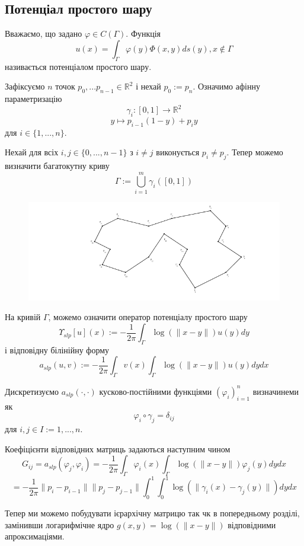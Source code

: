 \documentclass[12pt]{report}
\begin{document}
	\subsection{Потенціал простого шару}
	\begin{Def}
		Вважаємо, що задано $\varphi\in C(\Gamma)$. Функція $$u(x)=\int_{\Gamma}\varphi(y)\Phi(x,y)ds(y),  x\not\in\Gamma$$
		називається потенціалом простого шару.
	\end{Def}
	\par Зафіксуємо $n$ точок $p_0,...p_{n-1}\in \mathbb{R}^2$ і нехай $p_0:=p_n$. Означимо афінну параметризацію $$\gamma_i:[0,1]\rightarrow\mathbb{R}^2$$
	$$y\mapsto p_{i-1}(1-y)+p_iy$$
	для $i\in\{1,...,n\}$.
	\par Нехай для всіх $i,j\in\{0,...,n-1\}$ з $i\not=j$ виконується $p_i\not=p_j$. Тепер можемо визначити багатокутну криву
	$$\Gamma:=\bigcup_{i=1}^m\gamma_i([0,1])$$
	\begin{figure}[h]{
			\includegraphics{2_2}
		}
	\end{figure}
	\par На кривій $\Gamma$, можемо означити оператор потенціалу простого шару
	$$\Upsilon_{slp}[u](x):=-\frac{1}{2\pi}\int_{\Gamma}\log(\|x-y\|)u(y)dy$$
	і відповідну білінійну форму
	$$a_{slp}(u,v):=-\frac{1}{2\pi}\int_{\Gamma}v(x)\int_{\Gamma}\log(\|x-y\|)u(y)dydx$$
	\par Дискретизуємо $a_{slp}(\cdot,\cdot)$ кусково-постійними функціями $(\varphi_i)_{i=1}^n$ визначинеми як $$\varphi_i\circ\gamma_j=\delta_{ij}$$
	для $i,j\in I:={1,...,n}$.
	\par Коефіцієнти відповідних матриць задаються наступним чином $$G_{ij}=a_{slp}(\varphi_j,\varphi_i)=-\frac{1}{2\pi}\int_{\Gamma}\varphi_i(x)\int_{\Gamma}\log(\|x-y\|)\varphi_j(y)dydx$$
	$$=-\frac{1}{2\pi}\|p_i-p_{i-1}\| \|p_j-p_{j-1}\|\int_{0}^{1}\int_{0}^{1}\log(\|\gamma_i(x)-\gamma_j(y)\|)dydx$$
	\par Тепер ми можемо побудувати ієрархічну матрицю так чк в попередньому розділі, замінивши логарифмічне ядро $g(x,y)=\log(\|x-y\|)$ відповідними апроксимаціями.
\end{document}
